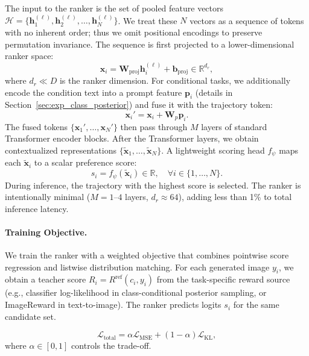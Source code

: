 \documentclass{article}
\begin{document}
The input to the ranker is the set of pooled feature vectors $\mathcal{H} = \{\mathbf{h}_1^{(\ell)}, \mathbf{h}_2^{(\ell)}, \ldots, \mathbf{h}_N^{(\ell)}\}$. We treat these $N$ vectors as a sequence of tokens with no inherent order; thus we omit positional encodings to preserve permutation invariance. The sequence is first projected to a lower-dimensional ranker space:
\begin{equation}
    \mathbf{x}_i = \mathbf{W}_{\text{proj}} \mathbf{h}_i^{(\ell)} + \mathbf{b}_{\text{proj}} \in \mathbb{R}^{d_r},
    \label{eq:x_i}
\end{equation}
where $d_r \ll D$ is the ranker dimension. For conditional tasks, we additionally encode the condition text into a prompt feature $\mathbf{p}_i$ (details in Section~\ref{sec:exp_class_posterior}) and fuse it with the trajectory token:
\begin{equation}
    \mathbf{x}_i' = \mathbf{x}_i + \mathbf{W}_{p}\mathbf{p}_i.
\label{eq:x_cond}
\end{equation}
The fused tokens $\{\mathbf{x}_1', \ldots, \mathbf{x}_N'\}$ then pass through $M$ layers of standard Transformer encoder blocks. After the Transformer layers, we obtain contextualized representations $\{\tilde{\mathbf{x}}_1, \ldots, \tilde{\mathbf{x}}_N\}$. A lightweight scoring head $f_{\psi}$ maps each $\tilde{\mathbf{x}}_i$ to a scalar preference score:
\begin{equation}
    s_i = f_{\psi}(\tilde{\mathbf{x}}_i) \in \mathbb{R}, \quad \forall i \in \{1,\ldots,N\}.
    \label{eq:s_i}
\end{equation}
During inference, the trajectory with the highest score is selected. The ranker is intentionally minimal ($M=1$--$4$ layers, $d_r \approx 64$), adding less than 1\% to total inference latency.

\paragraph{Training Objective.}

We train the ranker with a weighted objective that combines pointwise score regression and listwise distribution matching. For each generated image $y_i$, we obtain a teacher score $R_i = R^{\text{ref}}(c_i, y_i)$ from the task-specific reward source (e.g., classifier log-likelihood in class-conditional posterior sampling, or ImageReward in text-to-image). The ranker predicts logits $s_i$ for the same candidate set.

\begin{equation}
    \mathcal{L}_{\text{total}} = \alpha \mathcal{L}_{\text{MSE}} + (1-\alpha) \mathcal{L}_{\text{KL}},
\end{equation}
where $\alpha \in [0,1]$ controls the trade-off.
\end{document}

